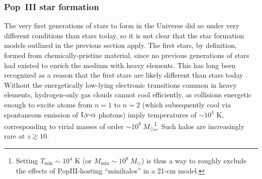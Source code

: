 \subsubsection{Pop~III star formation} \label{sec:popIII}
The very first generations of stars to form in the Universe did so under very different conditions than stars today, so it is not clear that the star formation models outlined in the previous section apply. The first stars, by definition, formed from chemically-pristine material, since no previous generations of stars had existed to enrich the medium with heavy elements. This has long been recognized as a reason that the first stars are likely different than stars today \cite{Abel2000,Bromm1999,OShea2007,Yoshida2003}. Without the energetically low-lying electronic transitions common in heavy elements, hydrogen-only gas clouds cannot cool efficiently, as collisions energetic enough to excite atoms from $n=1$ to $n=2$ (which subsequently cool via spontaneous emission of $\text{Ly-}\alpha$ photons) imply temperatures of $\sim 10^4$ K, corresponding to virial masses of order $\sim 10^8 \ M_{\odot}$\footnote{Setting $T_{\min} \sim 10^4$ K (or $M_{\min} \sim 10^8 \ M_{\odot}$) is thus a way to roughly exclude the effects of PopIII-hosting ``minihalos'' in a 21-cm model.}. Such halos are increasingly rare at $z \gtrsim 10$.

